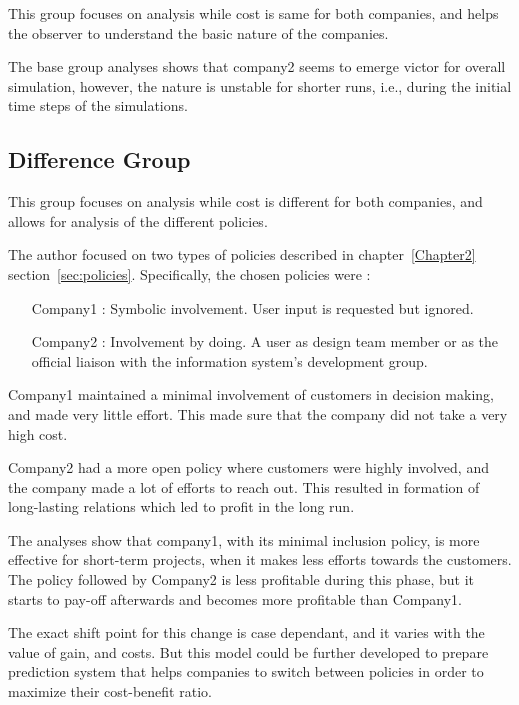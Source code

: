 This group focuses on analysis while cost is same for both companies, and helps the observer to understand the basic nature of the companies. 

The base group analyses shows that company2 seems to emerge victor for overall simulation, however, the nature is unstable for shorter runs, i.e., during the initial time steps of the simulations.



\subsection{Difference Group}

This group focuses on analysis while cost is different for both companies, and allows for analysis of the different policies.

The author focused on two types of policies described in chapter~\ref{Chapter2} section~\ref{sec:policies}. Specifically, the chosen policies were :

\begin{enumerate}
\item[Company1 :] Symbolic involvement. User input is requested but ignored.
\item[Company2 :] Involvement by doing. A user as design team member or as the official liaison with the information system’s development group.
\end{enumerate}


Company1 maintained a minimal involvement of customers in decision making, and made very little effort. This made sure that the company did not take a very high cost. 

Company2 had a more open policy where customers were highly involved, and the company made a lot of efforts to reach out. This resulted in formation of long-lasting relations which led to profit in the long run.

The analyses show that company1, with its minimal inclusion policy, is more effective for short-term projects, when it makes less efforts towards the customers. The policy followed by Company2 is less profitable during this phase, but it starts to pay-off afterwards and becomes more profitable than Company1.

The exact shift point for this change is case dependant, and it varies with the value of gain, and costs. But this model could be further developed to prepare prediction system that helps companies to switch between policies in order to maximize their cost-benefit ratio.
